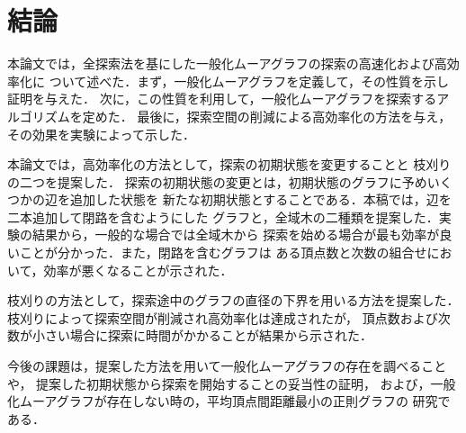 
\chapter{結論}
本論文では，全探索法を基にした一般化ムーアグラフの探索の高速化および高効率化に
ついて述べた．まず，一般化ムーアグラフを定義して，その性質を示し証明を与えた．
次に，この性質を利用して，一般化ムーアグラフを探索するアルゴリズムを定めた．
最後に，探索空間の削減による高効率化の方法を与え，その効果を実験によって示した．

本論文では，高効率化の方法として，探索の初期状態を変更することと
枝刈りの二つを提案した．
探索の初期状態の変更とは，初期状態のグラフに予めいくつかの辺を追加した状態を
新たな初期状態とすることである．本稿では，辺を二本追加して閉路を含むようにした
グラフと，全域木の二種類を提案した．実験の結果から，一般的な場合では全域木から
探索を始める場合が最も効率が良いことが分かった．また，閉路を含むグラフは
ある頂点数と次数の組合せにおいて，効率が悪くなることが示された．

枝刈りの方法として，探索途中のグラフの直径の下界を用いる方法を提案した．
枝刈りによって探索空間が削減され高効率化は達成されたが，
頂点数および次数が小さい場合に探索に時間がかかることが結果から示された．

今後の課題は，提案した方法を用いて一般化ムーアグラフの存在を調べることや，
提案した初期状態から探索を開始することの妥当性の証明，
および，一般化ムーアグラフが存在しない時の，平均頂点間距離最小の正則グラフの
研究である．
